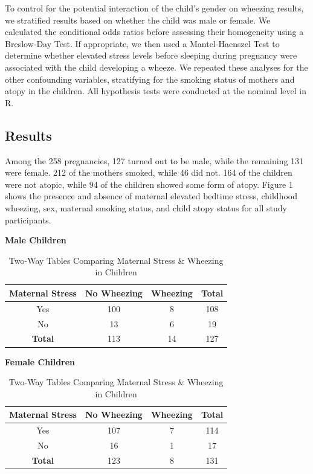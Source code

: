 \documentclass{article}
\begin{document}
	To control for the potential interaction of the child’s gender on wheezing results, we stratified results based on whether the child was male or female. We calculated the conditional odds ratios before assessing their homogeneity using a Breslow-Day Test. If appropriate, we then used a Mantel-Haenszel Test to determine whether elevated stress levels before sleeping during pregnancy were associated with the child developing a wheeze. We repeated these analyses for the other confounding variables, stratifying for the smoking status of mothers and atopy in the children. All hypothesis tests were conducted at the nominal level in R.

	\subsection*{Results}
	Among the 258 pregnancies, 127 turned out to be male, while the remaining 131 were female. 212 of the mothers smoked, while 46 did not. 164 of the children were not atopic, while 94 of the children showed some form of atopy. Figure 1 shows the presence and absence of maternal elevated bedtime stress, childhood wheezing, sex, maternal smoking status, and child atopy status for all study participants. 

	\begin{table}[h]
		\centering
		\footnotesize
		\caption{Two-Way Tables Comparing Maternal Stress \& Wheezing in Children}
		\begin{minipage}{0.48\linewidth}
			\centering
			\textbf{Male Children} \\[2pt]
			\begin{tabular}{cccc} %
				\toprule
				\textbf{Maternal Stress} & \textbf{No Wheezing} & \textbf{Wheezing} & \textbf{Total} \\
				\midrule
				Yes & 100 & 8 & 108 \\
				No & 13 & 6 & 19 \\
				\midrule
				\textbf{Total} & 113 & 14 & 127 \\
				\bottomrule
			\end{tabular}
		\end{minipage}
		\hfill
		\begin{minipage}{0.48\linewidth}
			\centering
			\textbf{Female Children} \\[2pt]
			\begin{tabular}{cccc} %
				\toprule
				\textbf{Maternal Stress} & \textbf{No Wheezing} & \textbf{Wheezing} & \textbf{Total} \\
				\midrule
				Yes & 107 & 7 & 114 \\
				No & 16 & 1 & 17 \\
				\midrule
				\textbf{Total} & 123 & 8 & 131 \\
				\bottomrule
			\end{tabular}
		\end{minipage}
	\end{table}
	
\end{document}
